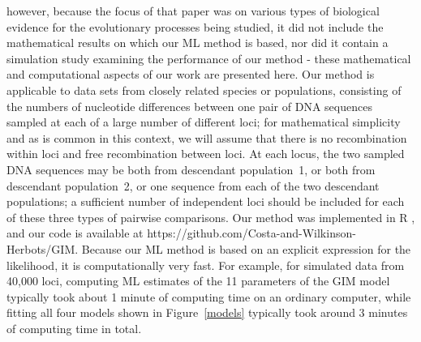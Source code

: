 \documentclass[11pt]{article}
\begin{document}
however, {\color{red} because the focus of that paper was on various types of biological evidence for the evolutionary processes being studied, it} did not include the mathematical results on which our ML method is based, 
nor did it contain a simulation study examining
the performance of our method - these {\color{red} mathematical and computational} aspects of our work are presented here.
Our method is applicable to data sets from closely related species or populations, consisting of the numbers of nucleotide differences between one pair of DNA sequences sampled at each of a large number of different loci;
{\color{red} for mathematical simplicity and} as is common in this context, we will assume that there is no recombination within loci and free recombination between loci. At each locus, the two sampled DNA sequences may be both from descendant population~1, or both from descendant population~2, or one sequence from each of the two descendant populations; a sufficient number of independent loci should be included for each of these three types of pairwise comparisons.
Our method was implemented in R \citep{R}, and our code 
is available at https://github.com/Costa-and-Wilkinson-Herbots/GIM.
Because our ML method is based on an explicit expression for the likelihood, it is computationally very fast. For example, for simulated data from 40,000 loci, computing ML estimates of the 11 parameters of the GIM model typically took about 1 minute of computing time on an ordinary computer, while fitting all four models shown in Figure~\ref{models} typically took around 3 minutes of computing time in total. 
\end{document}

